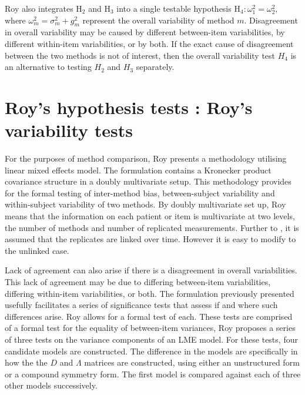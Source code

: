 \documentclass[12pt, a4paper]{report}
\theoremstyle{plain}
\theoremstyle{definition}
\theoremstyle{remark}
\begin{document}
Roy also integrates $\mathrm{H}_2$ and $\mathrm{H}_3$ into a single testable hypothesis $\mathrm{H}_4\colon \omega^2_1=\omega^2_2,$ where $\omega^2_m = \sigma^2_m + g^2_m$ represent the overall variability of method $m.$  Disagreement in overall variability may be caused by different between-item variabilities, by different within-item variabilities, or by both.  If the exact cause of disagreement between the two methods is not of interest, then the overall variability test $H_4$ is an alternative to testing $H_2$ and $H_3$ separately.



\section{Roy's hypothesis tests : Roy's variability tests}

For the purposes of method comparison, Roy presents a methodology utilising linear mixed effects model. The formulation contains a Kronecker product covariance structure in a doubly multivariate setup. This methodology provides for the formal testing of inter-method bias, between-subject variability and within-subject variability of two methods. By doubly multivariate set up, Roy means that the information on each patient or item is multivariate at two levels, the number of methods and number of replicated measurements. Further to \citet{Lam}, it is assumed that the replicates are linked over time. However it is easy to modify to the unlinked case.

Lack of agreement can also arise if there is a disagreement in overall variabilities. This lack of agreement may be due to differing between-item variabilities, differing within-item variabilities, or both. The formulation previously presented usefully facilitates a series of significance tests that assess if and where such differences arise. Roy allows for a formal test of each. These tests are comprised of a formal test for the equality of between-item variances,
Roy proposes a series of three tests on the variance components of an LME model. For these tests, four candidate models are constructed. The difference in the models are specifically in how the the $D$ and $\Lambda$ matrices are constructed, using either an unstructured form or a compound symmetry form. The first model is compared against each of three other models successively.
\end{document}
